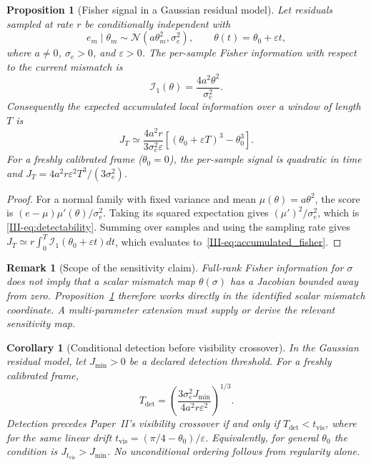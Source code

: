 \documentclass[12pt,a4paper,openany]{book}
\newtheorem{proposition}[theorem]{Proposition}
\newtheorem{remark}[theorem]{Remark}
\newtheorem{corollary}[theorem]{Corollary}
\begin{document}
\begin{proposition}[Fisher signal in a Gaussian residual model]
\label{III-prop:gaussian_fisher}
Let residuals sampled at rate $r$ be conditionally independent with
\begin{equation}
\label{III-eq:gaussian_residual}
e_m\mid\theta_m\sim\mathcal N(a\theta_m^2,\sigma_e^2),
\qquad \theta(t)=\theta_0+\varepsilon t,
\end{equation}
where $a\neq0$, $\sigma_e>0$, and $\varepsilon>0$.  The per-sample
Fisher information with respect to the current mismatch is
\begin{equation}
\label{III-eq:detectability}
\mathcal I_1(\theta)=\frac{4a^2\theta^2}{\sigma_e^2}.
\end{equation}
Consequently the expected accumulated local information over a window
of length $T$ is
\begin{equation}
\label{III-eq:accumulated_fisher}
J_T\simeq\frac{4a^2r}{3\sigma_e^2\varepsilon}
\left[(\theta_0+\varepsilon T)^3-\theta_0^3\right].
\end{equation}
For a freshly calibrated frame ($\theta_0=0$), the per-sample signal is
quadratic in time and $J_T=4a^2r\varepsilon^2T^3/(3\sigma_e^2)$.
\end{proposition}

\begin{proof}
For a normal family with fixed variance and mean
$\mu(\theta)=a\theta^2$, the score is
$(e-\mu)\mu'(\theta)/\sigma_e^2$.  Taking its squared
expectation gives $(\mu')^2/\sigma_e^2$, which is
\eqref{III-eq:detectability}.  Summing over samples and using the sampling
rate gives
$J_T\simeq r\int_0^T\mathcal I_1(\theta_0+\varepsilon t)dt$,
which evaluates to~\eqref{III-eq:accumulated_fisher}.
\end{proof}

\begin{remark}[Scope of the sensitivity claim]
\label{III-rem:fisher_sensitivity_scope}
Full-rank Fisher information for $\sigma$ does not imply that a scalar
mismatch map $\theta(\sigma)$ has a Jacobian bounded away from zero.
Proposition~\ref{III-prop:gaussian_fisher} therefore works directly in the
identified scalar mismatch coordinate.  A multi-parameter extension
must supply or derive the relevant sensitivity map.
\end{remark}

\begin{corollary}[Conditional detection before visibility crossover]
\label{III-cor:detection_window}
In the Gaussian residual model, let $J_{\min}>0$ be a declared
detection threshold.  For a freshly calibrated frame,
\begin{equation}
\label{III-eq:detection_window}
T_{\mathrm{det}}
=\left(\frac{3\sigma_e^2J_{\min}}
  {4a^2r\varepsilon^2}\right)^{1/3}.
\end{equation}
Detection precedes Paper~II's visibility crossover if and only if
$T_{\mathrm{det}}<t_{\mathrm{vis}}$, where for the same linear drift
$t_{\mathrm{vis}}=(\pi/4-\theta_0)/\varepsilon$.  Equivalently, for
general $\theta_0$ the condition is
$J_{t_{\mathrm{vis}}}>J_{\min}$.  No unconditional ordering follows
from regularity alone.
\end{corollary}
\end{document}
